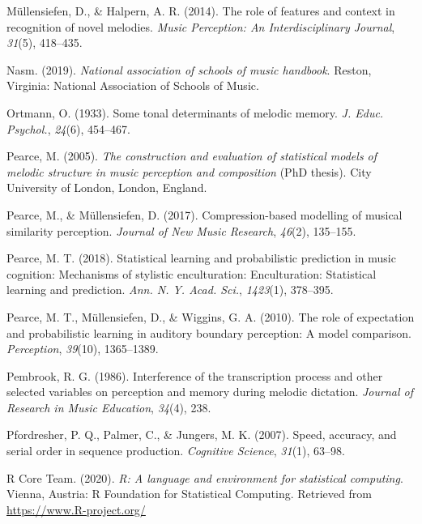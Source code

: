 \documentclass[english,man,floatsintext]{apa6}
\begin{document}
\leavevmode\hypertarget{ref-Mullensiefen2014-ta}{}%
Müllensiefen, D., \& Halpern, A. R. (2014). The role of features and context in recognition of novel melodies. \emph{Music Perception: An Interdisciplinary Journal}, \emph{31}(5), 418--435.

\leavevmode\hypertarget{ref-Nasm2019-fs}{}%
Nasm. (2019). \emph{National association of schools of music handbook}. Reston, Virginia: National Association of Schools of Music.

\leavevmode\hypertarget{ref-Ortmann1933-ty}{}%
Ortmann, O. (1933). Some tonal determinants of melodic memory. \emph{J. Educ. Psychol.}, \emph{24}(6), 454--467.

\leavevmode\hypertarget{ref-Pearce2005-hb}{}%
Pearce, M. (2005). \emph{The construction and evaluation of statistical models of melodic structure in music perception and composition} (PhD thesis). City University of London, London, England.

\leavevmode\hypertarget{ref-Pearce2017-rr}{}%
Pearce, M., \& Müllensiefen, D. (2017). Compression-based modelling of musical similarity perception. \emph{Journal of New Music Research}, \emph{46}(2), 135--155.

\leavevmode\hypertarget{ref-Pearce2018-lb}{}%
Pearce, M. T. (2018). Statistical learning and probabilistic prediction in music cognition: Mechanisms of stylistic enculturation: Enculturation: Statistical learning and prediction. \emph{Ann. N. Y. Acad. Sci.}, \emph{1423}(1), 378--395.

\leavevmode\hypertarget{ref-Pearce2010-mw}{}%
Pearce, M. T., Müllensiefen, D., \& Wiggins, G. A. (2010). The role of expectation and probabilistic learning in auditory boundary perception: A model comparison. \emph{Perception}, \emph{39}(10), 1365--1389.

\leavevmode\hypertarget{ref-Pembrook1986-cg}{}%
Pembrook, R. G. (1986). Interference of the transcription process and other selected variables on perception and memory during melodic dictation. \emph{Journal of Research in Music Education}, \emph{34}(4), 238.

\leavevmode\hypertarget{ref-pfordresher2007speed}{}%
Pfordresher, P. Q., Palmer, C., \& Jungers, M. K. (2007). Speed, accuracy, and serial order in sequence production. \emph{Cognitive Science}, \emph{31}(1), 63--98.

\leavevmode\hypertarget{ref-R-base}{}%
R Core Team. (2020). \emph{R: A language and environment for statistical computing}. Vienna, Austria: R Foundation for Statistical Computing. Retrieved from \url{https://www.R-project.org/}
\end{document}
